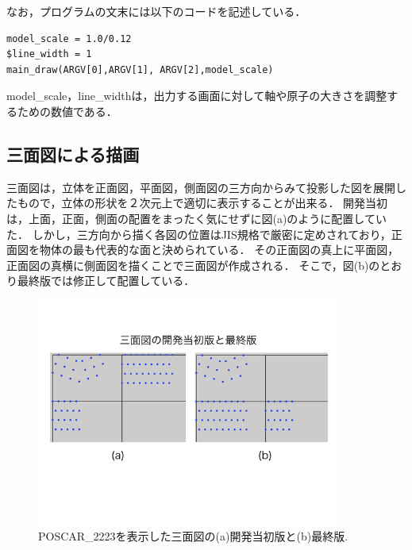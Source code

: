 なお，プログラムの文末には以下のコードを記述している．
\begin{lstlisting}[style=customRuby,basicstyle={\scriptsize\ttfamily}]
model_scale = 1.0/0.12
$line_width = 1
main_draw(ARGV[0],ARGV[1], ARGV[2],model_scale)
\end{lstlisting}
model\_scale，line\_widthは，出力する画面に対して軸や原子の大きさを調整するための数値である．

\subsection{三面図による描画}
三面図は，立体を正面図，平面図，側面図の三方向からみて投影した図を展開したもので，立体の形状を２次元上で適切に表示することが出来る．
開発当初は，上面，正面，側面の配置をまったく気にせずに図(a)のように配置していた．
しかし，三方向から描く各図の位置はJIS規格で厳密に定めされており，正面図を物体の最も代表的な面と決められている\cite{views}．
その正面図の真上に平面図，正面図の真横に側面図を描くことで三面図が作成される．
そこで，図(b)のとおり最終版では修正して配置している．

\begin{figure}[htbp]\begin{center}
\includegraphics[width=10cm,bb= 0 0 737 553]{../figs/./boundary_narita.014.jpeg}
\caption{POSCAR\_2223を表示した三面図の(a)開発当初版と(b)最終版.}
\label{default}\end{center}\end{figure}
